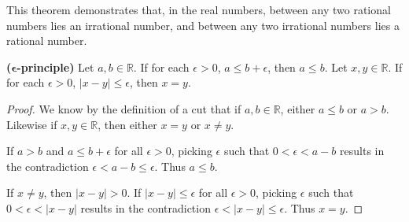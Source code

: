 \documentclass[12pt]{article}
\begin{document}
\begin{comm}
  This theorem demonstrates that, in the real numbers, between any two rational
  numbers lies an irrational number, and between any two irrational numbers lies a
  rational number.
\end{comm}

\begin{thm}
  \textbf{($\bm{\epsilon}$-principle)} Let $a,b \in \mathbb{R}$. If for each
  $\epsilon > 0$, $a \leq b + \epsilon$, then $a \leq b$. Let $x,y \in \mathbb{R}$.
  If for each $\epsilon > 0$, $|x - y| \leq \epsilon$, then $x = y$.

  \begin{proof}
    We know by the definition of a cut that if $a,b \in \mathbb{R}$, either $a \leq
    b$ or $a > b$. Likewise if $x,y \in \mathbb{R}$, then either $x = y$ or $x \neq
    y$.

    If $a > b$ and $a \leq b + \epsilon$ for all $\epsilon > 0$, picking $\epsilon$
    such that $0 < \epsilon < a - b$ results in the contradiction $\epsilon < a - b
    \leq \epsilon$. Thus $a \leq b$.

    If $x \neq y$, then $|x - y| > 0$. If $|x - y| \leq \epsilon$ for all $\epsilon >
    0$, picking $\epsilon$ such that $0 < \epsilon < |x - y|$ results in the
    contradiction $\epsilon < |x - y| \leq \epsilon$. Thus $x = y$.
  \end{proof}
\end{thm}
\end{document}
